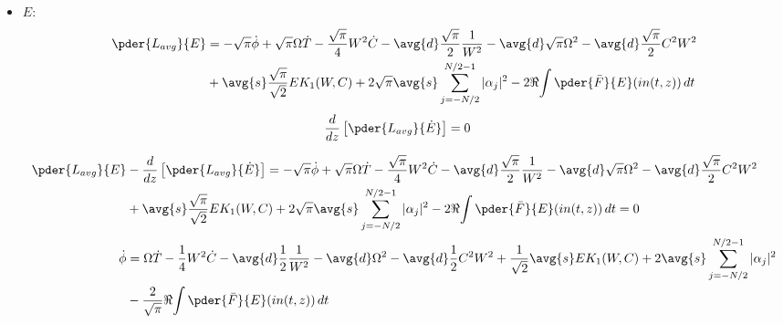 \begin{itemize}
\item $E$:
\begin{equation}
\begin{split}
\pder{L_{avg}}{E} &= -\sqrt{\pi} \dot{\phi} + \sqrt{\pi} \Omega \dot{T} - \frac{\sqrt{\pi}}{4} W^2\dot{C} - \avg{d} \frac{\sqrt{\pi}}{2} \frac{1}{W^2} - \avg{d}\sqrt{\pi} \Omega^2 - \avg{d}\frac{\sqrt{\pi}}{2} C^2 W^2\\
&+ \avg{s} \frac{\sqrt{\pi}}{\sqrt{2}} E K_1(W,C) + 2\sqrt{\pi}\avg{s}  \sum_{j=-N/2}^{N/2 - 1} |\alpha_j|^2- 2\Re{\int \pder{\bar{F}}{E} (in(t,z))\,dt}\\
\end{split}
\end{equation}
\begin{equation}
\begin{split}
\frac{d}{dz}\left[\pder{L_{avg}}{\dot{E}}\right]&= 0
\end{split}
\end{equation}

\begin{equation}
\begin{split}
\pder{L_{avg}}{E} &-\frac{d}{dz}\left[\pder{L_{avg}}{\dot{E}}\right]= -\sqrt{\pi} \dot{\phi} + \sqrt{\pi} \Omega \dot{T} - \frac{\sqrt{\pi}}{4} W^2\dot{C} - \avg{d} \frac{\sqrt{\pi}}{2} \frac{1}{W^2} - \avg{d}\sqrt{\pi} \Omega^2 - \avg{d}\frac{\sqrt{\pi}}{2} C^2 W^2\\
&+ \avg{s} \frac{\sqrt{\pi}}{\sqrt{2}} E K_1(W,C) + 2\sqrt{\pi}\avg{s}  \sum_{j=-N/2}^{N/2 - 1} |\alpha_j|^2 - 2\Re{\int \pder{\bar{F}}{E} (in(t,z))\,dt} = 0\\
\dot{\phi} &=  \Omega \dot{T} - \frac{1}{4} W^2\dot{C} - \avg{d} \frac{1}{2} \frac{1}{W^2} - \avg{d}\Omega^2 - \avg{d}\frac{1}{2} C^2 W^2+ \frac{1}{\sqrt{2}} \avg{s} E K_1(W,C) + 2\avg{s}  \sum_{j=-N/2}^{N/2 - 1} |\alpha_j|^2 \\
&- \frac{2}{\sqrt{\pi}}\Re{\int \pder{\bar{F}}{E} (in(t,z))\,dt} \\
\end{split}
\end{equation}


\end{itemize}

